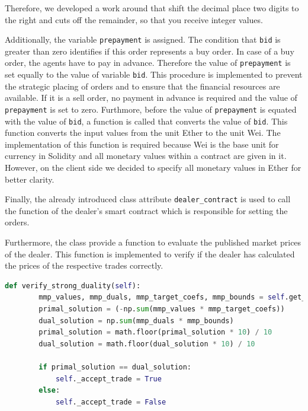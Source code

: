 Therefore, we developed a work around that shift the decimal place two digits to the right and cuts off the remainder,
so that you receive integer values. 

Additionally, the variable \verb|prepayment| is assigned. 
The condition that \verb|bid| is greater than zero identifies if this order represents a buy order.
In case of a buy order, the agents have to pay in advance.
Therefore the value of \verb|prepayment| is set equally to the value of variable \verb|bid|. 
This procedure is implemented to prevent the strategic placing of orders and to ensure that the financial resources are available.
If it is a sell order, no payment in advance is required and the value of \verb|prepayment| is set to zero.
Furthmore, before the value of \verb|prepayment| is equated with the value of \verb|bid|, a function is called 
that converts the value of \verb|bid|. This function converts the input values from the unit Ether to the unit
Wei. 
The implementation of this function is required because Wei is the base unit for currency in Solidity
and all monetary values within a contract are given in it. However, on the client side we decided to specify all monetary values in Ether
for better clarity.

Finally, the already introduced class attribute \verb|dealer_contract| is used to call the function of the dealer's smart contract which is
responsible for setting the orders.

Furthermore, the class provide a function to evaluate the published market prices of the dealer. 
This function is implemented to verify if the dealer has calculated the prices of the respective trades 
correctly.  

\begin{lstlisting}[float=htbp, label=lst:verify_trade, caption=Verification of trades, language=Python]
    def verify_strong_duality(self):
        mmp_values, mmp_duals, mmp_target_coefs, mmp_bounds = self.get_mmp_attributes()
        primal_solution = (-np.sum(mmp_values * mmp_target_coefs))
        dual_solution = np.sum(mmp_duals * mmp_bounds)
        primal_solution = math.floor(primal_solution * 10) / 10
        dual_solution = math.floor(dual_solution * 10) / 10

        if primal_solution == dual_solution:
            self._accept_trade = True
        else:
            self._accept_trade = False
\end{lstlisting}

